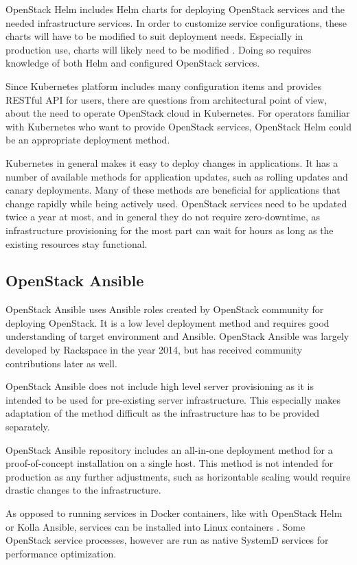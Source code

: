 \documentclass[officiallayout]{tktla}
\begin{document}
OpenStack Helm includes Helm charts for deploying OpenStack services and the
needed infrastructure services. In order to customize service configurations,
these charts will have to be modified to suit deployment needs. Especially in
production use, charts will likely need to be modified \cite{openstack-helm}.
Doing so requires knowledge of both Helm and configured OpenStack services.

Since Kubernetes platform includes many configuration items and provides
RESTful API for users, there are questions from architectural point of view,
about the need to operate OpenStack cloud in Kubernetes. For operators familiar
with Kubernetes who want to provide OpenStack services, OpenStack Helm could be
an appropriate deployment method.

Kubernetes in general makes it easy to deploy changes in applications. It has a
number of available methods for application updates, such as rolling updates
and canary deployments. Many of these methods are beneficial for applications
that change rapidly while being actively used. OpenStack services need to be
updated twice a year at most, and in general they do not require zero-downtime,
as infrastructure provisioning for the most part can wait for hours as long as
the existing resources stay functional.

\subsection{OpenStack Ansible}

OpenStack Ansible \cite{openstack-ansible} uses Ansible roles created by
OpenStack community for deploying OpenStack. It is a low level deployment
method and requires good understanding of target environment and Ansible.
OpenStack Ansible was largely developed by Rackspace in the year 2014, but has
received community contributions later as well.

OpenStack Ansible does not include high level server provisioning as it is
intended to be used for pre-existing server infrastructure. This especially
makes adaptation of the method difficult as the infrastructure has to be
provided separately.

OpenStack Ansible repository includes an all-in-one deployment method for a
proof-of-concept installation on a single host. This method is not intended for
production as any further adjustments, such as horizontable scaling would
require drastic changes to the infrastructure.

As opposed to running services in Docker containers, like with OpenStack Helm
or Kolla Ansible, services can be installed into Linux containers
\cite{linuxcontainers}. Some OpenStack service processes, however are run as
native SystemD services for performance optimization.
\end{document}
